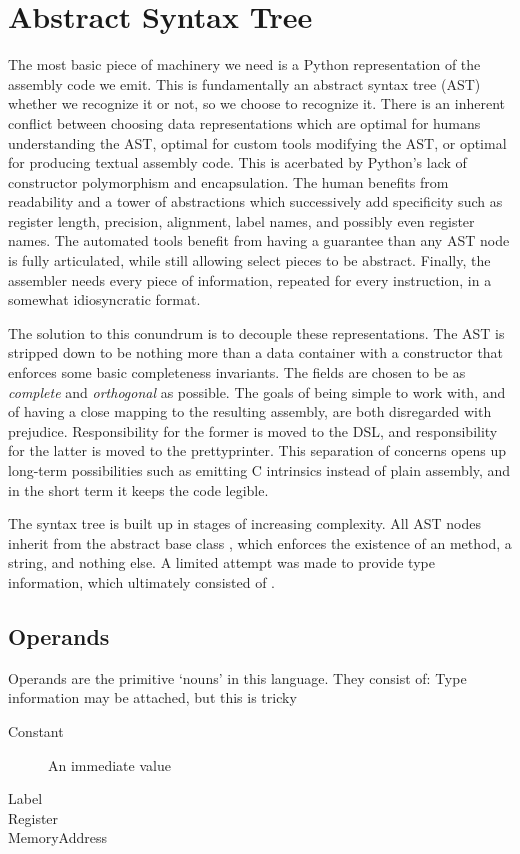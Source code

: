 \section{Abstract Syntax Tree}

The most basic piece of machinery we need is a Python representation of the assembly code we emit. This is fundamentally an abstract syntax tree (AST) whether we recognize it or not, so we choose to recognize it. There is an inherent conflict between choosing data representations which are optimal for humans understanding the AST, optimal for custom tools modifying the AST, or optimal for producing textual assembly code. This is acerbated by Python's lack of constructor polymorphism and encapsulation. The human benefits from readability and a tower of abstractions which successively add specificity such as register length, precision, alignment, label names, and possibly even register names. The automated tools benefit from having a guarantee than any AST node is fully articulated, while still allowing select pieces to be abstract. Finally, the assembler needs every piece of information, repeated for every instruction, in a somewhat idiosyncratic format.

The solution to this conundrum is to decouple these representations. The AST is stripped down to be nothing more than a data container with a constructor that enforces some basic completeness invariants. The fields are chosen to be as \emph{complete} and \emph{orthogonal} as possible. The goals of being simple to work with, and of having a close mapping to the resulting assembly, are both disregarded with prejudice. Responsibility for the former is moved to the DSL, and responsibility for the latter is moved to the prettyprinter. This separation of concerns opens up long-term possibilities such as emitting C intrinsics instead of plain assembly, and in the short term it keeps the code legible.

The syntax tree is built up in stages of increasing complexity. All AST nodes inherit from the abstract base class , which enforces the existence of an  method, a  string, and nothing else. A limited attempt was made to provide type information, which ultimately consisted of . 

\subsection{Operands}
Operands are the primitive `nouns' in this language. They consist of:
Type information may be attached, but this is tricky 
\begin{description}
  \item[Constant] An immediate value
  \item[Label]
  \item[Register]
  \item[MemoryAddress]
\end{description}

